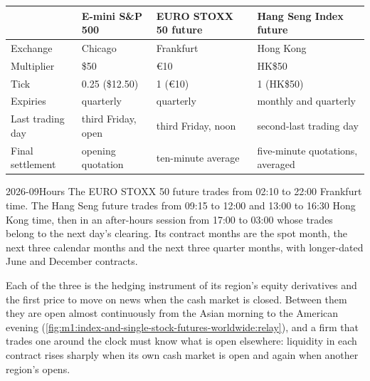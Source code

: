 \begin{center}
\small
\begin{tabular}{llll}
\toprule
 & E-mini S\&P 500 & EURO STOXX 50 future & Hang Seng Index future \\
\midrule
Exchange & Chicago & Frankfurt & Hong Kong \\
Multiplier & \$50 & \euro10 & HK\$50 \\
Tick & 0.25 (\$12.50) & 1 (\euro10) & 1 (HK\$50) \\
Expiries & quarterly & quarterly & monthly and quarterly \\
Last trading day & third Friday, open & third Friday, noon & second-last trading day \\
Final settlement & opening quotation & ten-minute average & five-minute quotations, averaged \\
\bottomrule
\end{tabular}
\end{center}

\begin{dated}{2026-09}{Hours}\label{dat:m1:index-and-single-stock-futures-worldwide:hours}
The EURO STOXX 50 future trades from 02:10 to 22:00 Frankfurt time. The Hang
Seng future trades from 09:15 to 12:00 and 13:00 to 16:30 Hong Kong time, then
in an after-hours session from 17:00 to 03:00 whose trades belong to the next
day's clearing. Its contract months are the spot month, the next three
calendar months and the next three quarter months, with longer-dated June
and December contracts.
\end{dated}

Each of the three is the hedging instrument of its region's equity
derivatives and the first price to move on news when the cash market is
closed. Between them they are open almost continuously from the Asian
morning to the American evening (\cref{fig:m1:index-and-single-stock-futures-worldwide:relay}),
and a firm that trades one around the clock must know what is open
elsewhere: liquidity in each contract rises sharply when its own cash market
is open and again when another region's opens.

